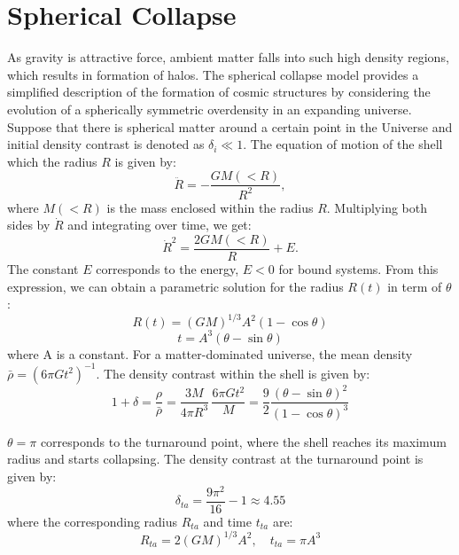 \section{Spherical Collapse}
As gravity is attractive force, ambient matter falls into such high density regions, which results in formation of halos. 
The spherical collapse model \citep{1972ApJ...176....1G} provides a simplified description of the formation of cosmic structures by considering the evolution of a spherically symmetric overdensity in an expanding universe. Suppose that there is spherical matter around a certain point in the Universe and initial density contrast is denoted as $\delta_i \ll 1$. The equation of motion of the shell which the radius $R$ is given by:
\begin{equation}
    \ddot{R} = -\frac{GM(<R)}{R^2},
\end{equation}
where $M(<R)$ is the mass enclosed within the radius $R$. Multiplying both sides by $\dot{R}$ and integrating over time, we get:
\begin{equation}
    \dot{R}^2 = \frac{2GM(<R)}{R} + E.
\end{equation}
The constant $E$ corresponds to the energy, $E < 0$ for bound systems. From this expression, we can obtain a parametric solution for the radius $R(t)$ in term of $\theta$:
\begin{equation}
    R(t) = (GM)^{1/3} A^2 \left(1 - \cos \theta \right)
\end{equation}
\begin{equation}
    t =  A^3 \left(\theta - \sin \theta \right)
\end{equation}
where A is a constant. For a matter-dominated universe, the mean density $\bar{\rho} = (6\pi Gt^2)^{-1}$. The density contrast within the shell is given by:
\begin{equation}
    1 + \delta = \frac{\rho}{\bar{\rho}} = \frac{3M}{4\pi R^3}\, \frac{6\pi Gt^2}{M} = \frac{9}{2} \frac{\left(\theta - \sin \theta \right)^2}{\left(1 - \cos \theta \right)^3} 
\end{equation}

$\theta = \pi$ corresponds to the turnaround point, where the shell reaches its maximum radius and starts collapsing. The density contrast at the turnaround point is given by:
\begin{equation}
    \delta_{ta} = \frac{9\pi^2}{16} - 1 \approx 4.55 
\end{equation}
where the corresponding radius $R_{ta}$ and time $t_{ta}$ are:
\begin{equation}
    R_{ta} =  2(GM)^{1/3}A^2, \quad t_{ta} = \pi A^3
\end{equation}

